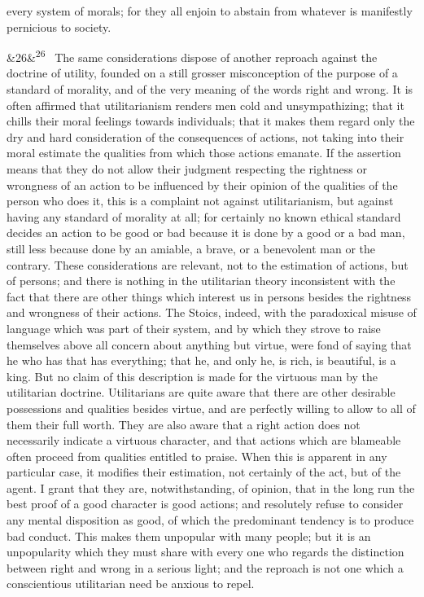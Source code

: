 \documentclass[12pt]{article}
\newcommand{\para}[1][]{\par\noindent\ifx&#1&\else\textsuperscript{\footnotesize #1}~\fi}
\begin{document}
every system of morals; for they all enjoin to abstain from whatever is manifestly pernicious to society.

\para[26] The same considerations dispose of another reproach against the doctrine of utility, founded on a still grosser misconception of the purpose of a standard of morality, and of the very meaning of the words right and wrong. It is often affirmed that utilitarianism renders men cold and unsympathizing; that it chills their moral feelings towards individuals; that it makes them regard only the dry and hard consideration of the consequences of actions, not taking into their moral estimate the qualities from which those actions emanate. If the assertion means that they do not allow their judgment respecting the rightness or wrongness of an action to be influenced by their opinion of the qualities of the person who does it, this is a complaint not against utilitarianism, but against having any standard of morality at all; for certainly no known ethical standard decides an action to be good or bad because it is done by a good or a bad man, still less because done by an amiable, a brave, or a benevolent man or the contrary. These considerations are relevant, not to the estimation of actions, but of persons; and there is nothing in the utilitarian theory inconsistent with the fact that there are other things which interest us in persons besides the rightness and wrongness of their actions. The Stoics, indeed, with the paradoxical misuse of language which was part of their system, and by which they strove to raise themselves above all concern about anything but virtue, were fond of saying that he who has that has everything; that he, and only he, is rich, is beautiful, is a king. But no claim of this description is made for the virtuous man by the utilitarian doctrine. Utilitarians are quite aware that there are other desirable possessions and qualities besides virtue, and are perfectly willing to allow to all of them their full worth. They are also aware that a right action does not necessarily indicate a virtuous character, and that actions which are blameable often proceed from qualities entitled to praise. When this is apparent in any particular case, it modifies their estimation, not certainly of the act, but of the agent. I grant that they are, notwithstanding, of opinion, that in the long run the best proof of a good character is good actions; and resolutely refuse to consider any mental disposition as good, of which the predominant tendency is to produce bad conduct. This makes them unpopular with many people; but it is an unpopularity which they must share with every one who regards the distinction between right and wrong in a serious light; and the reproach is not one which a conscientious utilitarian need be anxious to repel.
\end{document}
